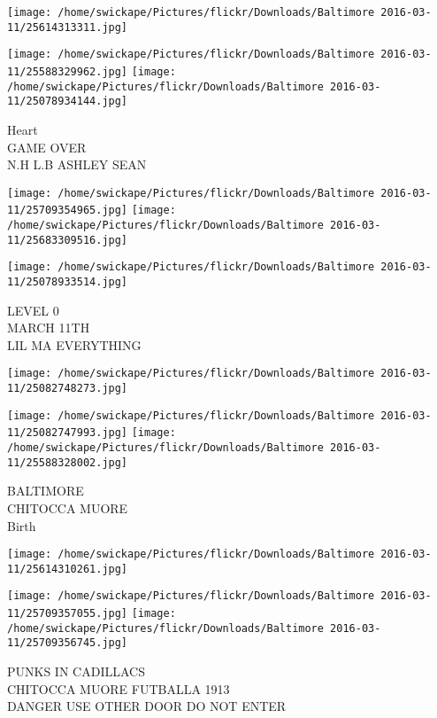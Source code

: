 \documentclass[10pt,letterpaper]{article}
\begin{document}
\texttt{[image: /home/swickape/Pictures/flickr/Downloads/Baltimore 2016-03-11/25614313311.jpg]}

\vspace{0.25in}
\texttt{[image: /home/swickape/Pictures/flickr/Downloads/Baltimore 2016-03-11/25588329962.jpg]}
\texttt{[image: /home/swickape/Pictures/flickr/Downloads/Baltimore 2016-03-11/25078934144.jpg]}

Heart\\
GAME OVER\\
N.H L.B ASHLEY SEAN
\pagebreak

\texttt{[image: /home/swickape/Pictures/flickr/Downloads/Baltimore 2016-03-11/25709354965.jpg]}
\texttt{[image: /home/swickape/Pictures/flickr/Downloads/Baltimore 2016-03-11/25683309516.jpg]}

\vspace{0.25in}
\texttt{[image: /home/swickape/Pictures/flickr/Downloads/Baltimore 2016-03-11/25078933514.jpg]}

LEVEL 0\\
MARCH 11TH\\
LIL MA EVERYTHING
\pagebreak

\texttt{[image: /home/swickape/Pictures/flickr/Downloads/Baltimore 2016-03-11/25082748273.jpg]}

\vspace{0.25in}
\texttt{[image: /home/swickape/Pictures/flickr/Downloads/Baltimore 2016-03-11/25082747993.jpg]}
\texttt{[image: /home/swickape/Pictures/flickr/Downloads/Baltimore 2016-03-11/25588328002.jpg]}

BALTIMORE\\
CHITOCCA MUORE\\
Birth
\pagebreak

\texttt{[image: /home/swickape/Pictures/flickr/Downloads/Baltimore 2016-03-11/25614310261.jpg]}

\vspace{0.25in}
\texttt{[image: /home/swickape/Pictures/flickr/Downloads/Baltimore 2016-03-11/25709357055.jpg]}
\texttt{[image: /home/swickape/Pictures/flickr/Downloads/Baltimore 2016-03-11/25709356745.jpg]}

PUNKS IN CADILLACS\\
CHITOCCA MUORE FUTBALLA 1913\\
DANGER USE OTHER DOOR DO NOT ENTER
\pagebreak
\end{document}
